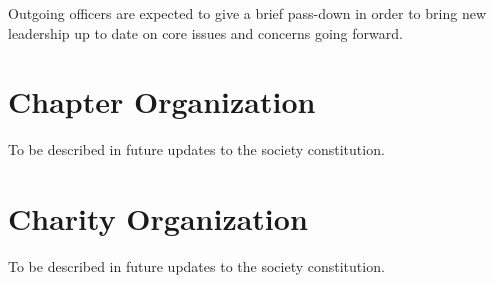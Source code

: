 \documentclass[]{article}
\begin{document}
\vspace{2mm}
\noindent 
Outgoing officers are expected to give a brief pass-down in order to bring new leadership up to date on core issues and concerns going forward.

\clearpage

\color{red}

\section{Chapter Organization}
\label{sec:chapter_org}

To be described in future updates to the society constitution. 

\clearpage

\section{Charity Organization}
\label{sec:charity_org}

To be described in future updates to the society constitution. 

\color{black}
\end{document}
